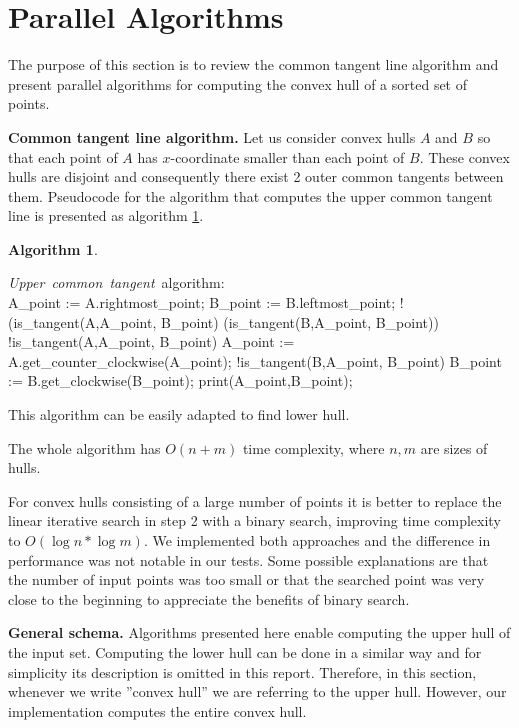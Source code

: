 \documentclass[letterpaper]{article}
\newcommand{\mypar}[1]{{\bf #1.}}
\theoremstyle{definition}
\newtheorem{algorithm}{Algorithm}
\begin{document}
\section{Parallel Algorithms}

The purpose of this section is to review the common tangent line algorithm and present parallel algorithms for computing the convex hull of a sorted set of points.

\mypar{Common tangent line algorithm}
Let us consider convex hulls $A$ and $B$ so that each point of $A$ has $x$-coordinate smaller than each point of $B$. 
These convex hulls are disjoint and consequently there exist 2 outer common tangents between them. 
Pseudocode for the algorithm that computes the upper common tangent line is presented as algorithm \ref{alg:common-tangent}.

\begin{algorithm}
\label{alg:common-tangent}
\begin{program}
\mbox{{\it Upper common tangent} algorithm:}
\BEGIN \\ %
  A\_point := A.rightmost\_point;
  B\_point := B.leftmost\_point;
\WHILE !(is\_tangent(A,A\_point, B\_point) \AND 
 (is\_tangent(B,A\_point, B\_point)) \DO
	  \WHILE !is\_tangent(A,A\_point, B\_point) \DO
		A\_point :=
		\;\;\;\;A.get\_counter\_clockwise(A\_point);
	  \OD 
	  \WHILE !is\_tangent(B,A\_point, B\_point) \DO
		B\_point := B.get\_clockwise(B\_point);
	  \OD  
 \OD
 print(A\_point,B\_point);
\END
\end{program}
\end{algorithm}

This algorithm can be easily adapted to find lower hull.

The whole algorithm has $O(n+m)$ time complexity, where $n,m$ are sizes of hulls.

For convex hulls consisting of a large number of points it is better to replace the linear iterative search in step 2 with a binary search, improving time complexity to $O(\log n*\log m)$.
We implemented both approaches and the difference in performance was not notable in our tests.
Some possible explanations are that the number of input points was too small or that the searched point was very close to the beginning to appreciate the benefits of binary search.

\mypar{General schema}
Algorithms presented here enable computing the upper hull of the input set. 
Computing the lower hull can be done in a similar way and for simplicity its description is omitted in this report. 
Therefore, in this section, whenever we write ''convex hull'' we are referring to the upper hull.
However, our implementation computes the entire convex hull.
\end{document}
